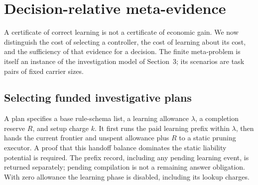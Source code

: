 \section{Decision-relative meta-evidence}\label{sec:meta-evidence}
A certificate of correct learning is not a certificate of economic gain. We now distinguish the cost of selecting a controller, the cost of learning about its cost, and the sufficiency of that evidence for a decision. The finite meta-problem is itself an instance of the investigation model of Section~3; its scenarios are task pairs of fixed carrier sizes.

\subsection{Selecting funded investigative plans}
A plan specifies a base rule-schema list, a learning allowance $\lambda$, a completion reserve $R$, and setup charge $k$. It first runs the paid learning prefix within $\lambda$, then hands the current frontier and unspent allowance plus $R$ to a static pruning executor. A proof that this handoff balance dominates the static liability potential is required. The prefix record, including any pending learning event, is returned separately; pending compilation is not a remaining answer obligation. With zero allowance the learning phase is disabled, including its lookup charges.

